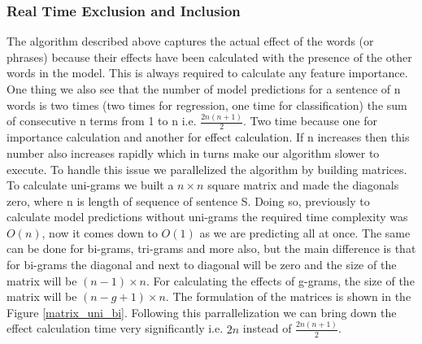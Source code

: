 \documentclass[11pt]{article}
\begin{document}
\subsubsection{Real Time Exclusion and Inclusion}
The algorithm described above captures the actual effect of the words (or phrases) because their effects have been calculated with the presence of the other words in the model. This is always required to calculate any feature importance. One thing we also see that the number of model predictions for a sentence of n words is two times (two times for regression, one time for classification) the sum of consecutive n terms from 1 to n i.e. $\frac{2n(n+1)}{2}$. Two time because one for importance calculation and another for effect calculation. If n increases then this number also increases rapidly which in turns make our algorithm slower to execute. To handle this issue we parallelized the algorithm by building matrices. To calculate uni-grams we built a $n\times n$ square matrix and made the diagonals zero, where n is length of sequence of sentence S. Doing so, previously to calculate model predictions without uni-grams the required time complexity was $O(n)$, now it comes down to $O(1)$ as we are predicting all at once. The same can be done for bi-grams, tri-grams and more also, but the main difference is that for bi-grams the diagonal and next to diagonal will be zero and the size of the matrix will be $(n-1) \times n$. For calculating the effects of g-grams, the size of the matrix will be $(n-g+1) \times n$. The formulation of the matrices is shown in the Figure \ref{matrix_uni_bi}. Following this parrallelization we can bring down the effect calculation time very significantly i.e. $2n$ instead of $\frac{2n(n+1)}{2}$.
\end{document}
